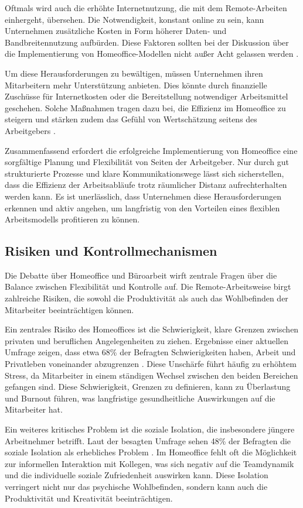 Oftmals wird auch die erhöhte Internetnutzung, die mit dem Remote-Arbeiten einhergeht, übersehen. Die Notwendigkeit, konstant online zu sein, kann Unternehmen zusätzliche Kosten in Form höherer Daten- und Bandbreitennutzung aufbürden. Diese Faktoren sollten bei der Diskussion über die Implementierung von Homeoffice-Modellen nicht außer Acht gelassen werden \cite{7}.

Um diese Herausforderungen zu bewältigen, müssen Unternehmen ihren Mitarbeitern mehr Unterstützung anbieten. Dies könnte durch finanzielle Zuschüsse für Internetkosten oder die Bereitstellung notwendiger Arbeitsmittel geschehen. Solche Maßnahmen tragen dazu bei, die Effizienz im Homeoffice zu steigern und stärken zudem das Gefühl von Wertschätzung seitens des Arbeitgebers \cite{7}.

Zusammenfassend erfordert die erfolgreiche Implementierung von Homeoffice eine sorgfältige Planung und Flexibilität von Seiten der Arbeitgeber. Nur durch gut strukturierte Prozesse und klare Kommunikationswege lässt sich sicherstellen, dass die Effizienz der Arbeitsabläufe trotz räumlicher Distanz aufrechterhalten werden kann. Es ist unerlässlich, dass Unternehmen diese Herausforderungen erkennen und aktiv angehen, um langfristig von den Vorteilen eines flexiblen Arbeitsmodells profitieren zu können.

\subsection{Risiken und Kontrollmechanismen}

Die Debatte über Homeoffice und Büroarbeit wirft zentrale Fragen über die Balance zwischen Flexibilität und Kontrolle auf. Die Remote-Arbeitsweise birgt zahlreiche Risiken, die sowohl die Produktivität als auch das Wohlbefinden der Mitarbeiter beeinträchtigen können.

Ein zentrales Risiko des Homeoffices ist die Schwierigkeit, klare Grenzen zwischen privaten und beruflichen Angelegenheiten zu ziehen. Ergebnisse einer aktuellen Umfrage zeigen, dass etwa 68\% der Befragten Schwierigkeiten haben, Arbeit und Privatleben voneinander abzugrenzen \cite{file4}. Diese Unschärfe führt häufig zu erhöhtem Stress, da Mitarbeiter in einem ständigen Wechsel zwischen den beiden Bereichen gefangen sind. Diese Schwierigkeit, Grenzen zu definieren, kann zu Überlastung und Burnout führen, was langfristige gesundheitliche Auswirkungen auf die Mitarbeiter hat.

Ein weiteres kritisches Problem ist die soziale Isolation, die insbesondere jüngere Arbeitnehmer betrifft. Laut der besagten Umfrage sehen 48\% der Befragten die soziale Isolation als erhebliches Problem \cite{file4}. Im Homeoffice fehlt oft die Möglichkeit zur informellen Interaktion mit Kollegen, was sich negativ auf die Teamdynamik und die individuelle soziale Zufriedenheit auswirken kann. Diese Isolation verringert nicht nur das psychische Wohlbefinden, sondern kann auch die Produktivität und Kreativität beeinträchtigen.

